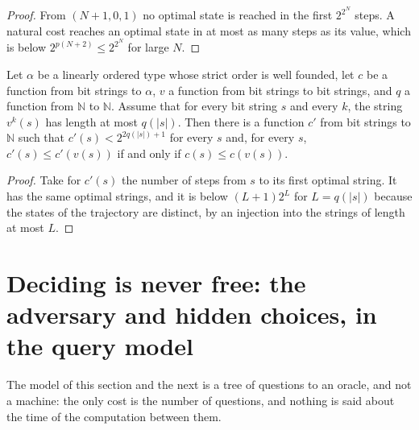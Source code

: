 \begin{proof}
  \leanok
  From $(N+1, 0, 1)$ no optimal state is reached in the first $2^{2^N}$ steps. A natural cost
  reaches an optimal state in at most as many steps as its value, which is below
  $2^{p(N+2)} \le 2^{2^N}$ for large $N$.
\end{proof}

\begin{theorem}
  \label{thm:search-colapsa-por-conteo}
  \leanok
  Let $\alpha$ be a linearly ordered type whose strict order is well founded, let $c$ be a function
  from bit strings to $\alpha$, $v$ a function from bit strings to bit strings, and $q$ a function
  from $\mathbb{N}$ to $\mathbb{N}$. Assume that for every bit string $s$ and every $k$, the string
  $v^k(s)$ has length at most $q(|s|)$. Then there is a function $c'$ from bit strings to
  $\mathbb{N}$ such that $c'(s) < 2^{2 q(|s|) + 1}$ for every $s$ and, for every $s$,
  $c'(s) \le c'(v(s))$ if and only if $c(s) \le c(v(s))$.
\end{theorem}

\begin{proof}
  \leanok
  Take for $c'(s)$ the number of steps from $s$ to its first optimal string. It has the same
  optimal strings, and it is below $(L+1)2^L$ for $L = q(|s|)$ because the states of the trajectory
  are distinct, by an injection into the strings of length at most $L$.
\end{proof}

\section{Deciding is never free: the adversary and hidden choices, in the query model}
\label{sec:search-adversary}

The model of this section and the next is a tree of questions to an oracle, and not a machine: the
only cost is the number of questions, and nothing is said about the time of the computation between
them.

